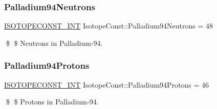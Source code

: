 \subsubsection{\texorpdfstring{Palladium94\+Neutrons}{Palladium94Neutrons}}
{\footnotesize\ttfamily \mbox{\hyperlink{group___isotope_const-_macros_ga5f18360b3e99483a35c32d789e62621c}{I\+S\+O\+T\+O\+P\+E\+C\+O\+N\+S\+T\+\_\+\+I\+NT}} Isotope\+Const\+::\+Palladium94\+Neutrons = 48}

\$ \$ Neutrons in Palladium-\/94. \mbox{\label{group___isotope_const-_palladium-_pd94_ga6235490cace82a601170e56e99cf4127}} 
\subsubsection{\texorpdfstring{Palladium94\+Protons}{Palladium94Protons}}
{\footnotesize\ttfamily \mbox{\hyperlink{group___isotope_const-_macros_ga5f18360b3e99483a35c32d789e62621c}{I\+S\+O\+T\+O\+P\+E\+C\+O\+N\+S\+T\+\_\+\+I\+NT}} Isotope\+Const\+::\+Palladium94\+Protons = 46}

\$ \$ Protons in Palladium-\/94. 